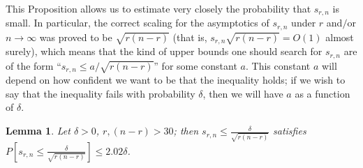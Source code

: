 \documentclass{article}
\newtheorem{lemma}[theorem]{Lemma}
\theoremstyle{definition}
\newcommand{\smin}{s_{r,n}}
\begin{document}
This Proposition allows us to estimate very closely the probability that $\smin$ is small. In particular, the correct scaling for the asymptotics of $\smin$ under $r$ and$\slash$or $n \rightarrow \infty$ was proved to be $\sqrt{r(n-r)}$ (that is, $\smin \sqrt{r(n-r)} = O(1)$ almost surely), which means that the kind of upper bounds one should search for $\smin$ are of the form ``$\smin \leq a/\sqrt{r(n-r)}$'' for some constant $a$. This constant $a$ will depend on how confident we want to be that the inequality holds; if we wish to say that the inequality fails with probability $\delta$, then we will have $a$ as a function of $\delta$. 

\begin{lemma} 
\label{low_bd}
Let $\delta>0$, $r, (n-r)>30$; then $\smin \leq \frac{\delta}{\sqrt{r(n-r)}}$
satisfies $P\left [ \smin \leq \frac{\delta}{\sqrt{r(n-r)}} \right] \leq  2.02 \delta$.
\end{lemma}
\end{document}

